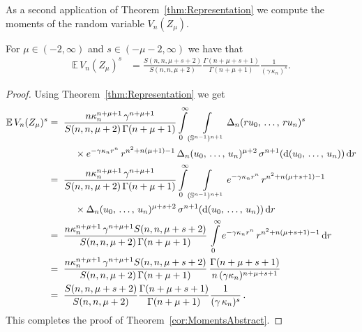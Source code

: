 \documentclass[AHL,Unicode,longabstracts,published]{cedram}
\newcommand{\Sp}{\mathbb S}
\newcommand{\EE}{\mathbb{E}\,}
\newcommand{\dd}{{\rm d}}
\begin{document}
As a second application of Theorem~\ref{thm:Representation} we compute the moments of the random variable $V_n(Z_\mu)$.

\begin{theo}\label{cor:MomentsAbstract}
For $\mu\in(-2,\infty)$ and $s\in(-\mu-2,\infty)$ we have that
\begin{align*}
\EE V_n(Z_\mu)^s &= \frac{S(n,n,\mu+s+2)}{S(n,n,\mu+2)}\frac{\Gamma(n+\mu+s+1)}{\Gamma(n+\mu+1)}\frac{1}{(\gamma\,\kappa_n)^s}.
\end{align*}
\end{theo}


\begin{proof}
Using Theorem~\ref{thm:Representation} we get
\begin{align*}
\EE V_n(Z_\mu)^s &=\;\frac{n\kappa_n^{n+\mu+1}\,\gamma^{n+\mu+1}}{S(n,n,\mu+2)\,\Gamma(n+\mu+1)}\int\limits_0^\infty\int\limits_{(\Sp^{n-1})^{n+1}}\Delta_n(ru_0,\,\ldots,\,ru_n)^s\\
&\mkern50mu\times e^{-\gamma\kappa_nr^n}\,r^{n^2+n(\mu+1)-1}\,\Delta_n(u_0,\,\ldots,\,u_n)^{\mu+2}\,\sigma^{n+1}(\dd(u_0,\,\ldots,\,u_n))\,\dd r\\
&=\;\frac{n\kappa_n^{n+\mu+1}\,\gamma^{n+\mu+1}}{S(n,n,\mu+2)\,\Gamma(n+\mu+1)}\int\limits_0^\infty\int\limits_{(\Sp^{n-1})^{n+1}}e^{-\gamma\kappa_nr^n}\,r^{n^2+n(\mu+s+1)-1}\\
&\mkern50mu\times\Delta_n(u_0,\,\ldots,\,u_n)^{\mu+s+2}\,\sigma^{n+1}(\dd(u_0,\,\ldots,\,u_n))\,\dd r\\
&=\;\frac{n\kappa_n^{n+\mu+1}\,\gamma^{n+\mu+1}S(n,n,\mu+s+2)}{S(n,n,\mu+2)\,\Gamma(n+\mu+1)}\,\int\limits_0^\infty e^{-\gamma\kappa_nr^n}\,r^{n^2+n(\mu+s+1)-1}\,\dd r\\
&=\;\frac{n\kappa_n^{n+\mu+1}\,\gamma^{n+\mu+1} S(n,n,\mu+s+2)}{S(n,n,\mu+2)\,\Gamma(n+\mu+1)}\,\frac{\Gamma(n+\mu+s+1)}{n\,(\gamma\kappa_n)^{n+\mu+s+1}}\\
&=\;\frac{S(n,n,\mu+s+2)}{S(n,n,\mu+2)}\frac{\Gamma(n+\mu+s+1)}{\Gamma(n+\mu+1)}\frac{1}{(\gamma\,\kappa_n)^s}\,.
\end{align*}
This completes the proof of Theorem~\ref{cor:MomentsAbstract}.
\end{proof}
\end{document}
